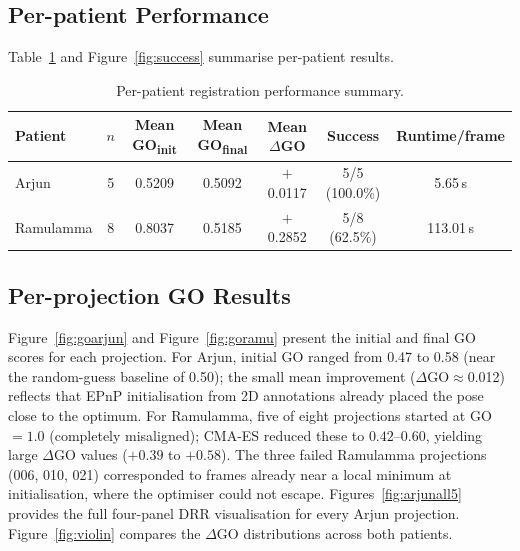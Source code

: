 \documentclass[10pt,a4paper]{article}
\begin{document}
\subsection{Per-patient Performance}
\label{sec:patient}

Table~\ref{tab:patient} and Figure~\ref{fig:success} summarise
per-patient results.

\begin{table}[H]
\centering
\caption{Per-patient registration performance summary.}
\label{tab:patient}
\begin{tabular}{lcccccc}
\toprule
\textbf{Patient} & \textbf{$n$} & \textbf{Mean GO\textsubscript{init}} &
\textbf{Mean GO\textsubscript{final}} & \textbf{Mean $\Delta$GO} &
\textbf{Success} & \textbf{Runtime/frame} \\
\midrule
Arjun     & 5 & 0.5209 & 0.5092 & $+$0.0117 & 5/5 (100.0\%) & 5.65\,s \\
Ramulamma & 8 & 0.8037 & 0.5185 & $+$0.2852 & 5/8  (62.5\%)  & 113.01\,s \\
\bottomrule
\end{tabular}
\end{table}

\subsection{Per-projection GO Results}
\label{sec:perframe}

Figure~\ref{fig:goarjun} and Figure~\ref{fig:goramu} present the initial and final GO scores for
each projection.
For Arjun, initial GO ranged from 0.47 to 0.58 (near the random-guess
baseline of 0.50); the small mean improvement ($\Delta$GO$\approx$0.012)
reflects that EPnP initialisation from 2D annotations already placed
the pose close to the optimum.
For Ramulamma, five of eight projections started at GO$=1.0$
(completely misaligned); CMA-ES reduced these to $0.42$--$0.60$,
yielding large $\Delta$GO values ($+0.39$ to $+0.58$).
The three failed Ramulamma projections
(006, 010, 021) corresponded to frames already near a local minimum at
initialisation, where the optimiser could not escape.
Figures~\ref{fig:arjunall5} provides the
full four-panel DRR visualisation for every Arjun projection.
Figure~\ref{fig:violin} compares the $\Delta$GO distributions
across both patients.
\end{document}
